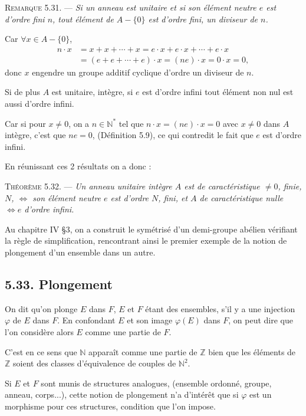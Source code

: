 \medskip\noindent\textsc{Remarque 5.31.} --- \emph{Si un anneau est unitaire et si son élément neutre $e$ est d'ordre fini $n$, tout élément de $A-\{0\}$ est d'ordre fini, un diviseur de $n$.}

Car $\forall x\in A-\{0\}$,
\begin{align*}
n\cdot x&=x+x+\cdots+x=e\cdot x+e\cdot x+\cdots+e\cdot x\\
&=(e+e+\cdots+e)\cdot x=(ne)\cdot x=0\cdot x=0,
\end{align*}
donc $x$ engendre un groupe additif cyclique d'ordre un diviseur de $n$. \bookend

Si de plus $A$ est unitaire, intègre, si $e$ est d'ordre infini tout élément non nul est aussi d'ordre infini.

Car si pour $x\ne0$, on a $n\in\mathbb N^*$ tel que $n\cdot x=(ne)\cdot x=0$ avec $x\ne0$ dans $A$ intègre, c'est que $ne=0$, (Définition 5.9), ce qui contredit le fait que $e$ est d'ordre infini.

En réunissant ces 2 résultats on a donc :

\medskip\noindent\textsc{Théorème 5.32.} --- \emph{Un anneau unitaire intègre $A$ est de caractéristique $\ne0$, finie, $N$, $\Longleftrightarrow$ son élément neutre $e$ est d'ordre $N$, fini, et $A$ de caractéristique nulle $\Longleftrightarrow e$ d'ordre infini.} \bookend


Au chapitre IV §3, on a construit le symétrisé d'un demi-groupe abélien vérifiant la règle de simplification, rencontrant ainsi le premier exemple de la notion de plongement d'un ensemble dans un autre.

\subsection*{5.33. Plongement}
On dit qu'on plonge $E$ dans $F$, $E$ et $F$ étant des ensembles, s'il y a une injection $\varphi$ de $E$ dans $F$. En confondant $E$ et son image $\varphi(E)$ dans $F$, on peut dire que l'on considère alors $E$ comme une partie de $F$.

C'est en ce sens que $\mathbb N$ apparaît comme une partie de $\mathbb Z$ bien que les éléments de $\mathbb Z$ soient des classes d'équivalence de couples de $\mathbb N^2$.

Si $E$ et $F$ sont munis de structures analogues, (ensemble ordonné, groupe, anneau, corps...), cette notion de plongement n'a d'intérêt que si $\varphi$ est un morphisme pour ces structures, condition que l'on impose.

